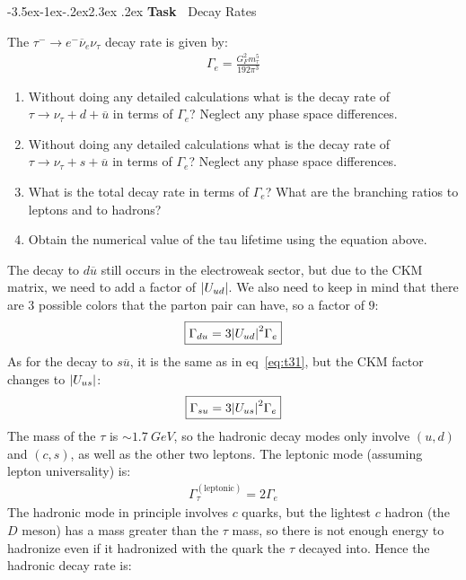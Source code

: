 \documentclass[12pt]{article}
\makeatletter
\renewcommand{\bar}{\overline}
\def\section{\@startsection{section}{1}{\z@ }%
  {-3.5ex\@plus -1ex\@minus -.2ex}{2.3ex \@plus .2ex}%
  {\noindent\normalfont \Large \bfseries Task\ }%
}
\numberwithin{equation}{section}
\makeatother
\begin{document}
\section{Decay Rates}
\begin{problem}
  The $\tau^-\to e^-\overline{\nu}_e\nu_\tau$ decay rate is given by:
  \begin{align*}
    \Gamma_e=\frac{G_F^2m_\tau^5}{192\pi^3}
  \end{align*}
  \begin{enumerate}
  \item Without doing any detailed calculations what is the decay rate of $\tau\to\nu_\tau+d+\overline{u}$ in terms of  $\Gamma_e$? Neglect any phase space differences.
  \item Without doing any detailed calculations what is the decay rate of $\tau\to\nu_\tau+s+\overline{u}$ in terms of  $\Gamma_e$? Neglect any phase space differences.
  \item What is the total decay rate in terms of $\Gamma_e$? What are the branching ratios to leptons and to hadrons?
  \item Obtain the numerical value of the tau lifetime using the equation above.
  \end{enumerate}
\end{problem}
The decay to $d\overline{u}$ still occurs in the electroweak sector, but due to the CKM matrix, we need to add a factor of $\abs{U_{ud}}$. We also need to keep in mind that there are 3 possible colors that the parton pair can have, so a factor of $9$:
\begin{equation}
  \label{eq:t31}
  \boxed{\Gamma_{du}=3\abs{U_{ud}}^2\Gamma_e}
\end{equation}
As for the decay to $s\bar{u}$, it is the same as in eq~\eqref{eq:t31}, but the CKM factor changes to $\abs{U_{us}}$:
\begin{equation}
  \label{eq:t32}
  \boxed{\Gamma_{su}=3\abs{U_{us}}^2\Gamma_e}
\end{equation}
The mass of the $\tau$ is $\sim\SI{1.7}{GeV}$, so the hadronic decay modes only involve $(u,d)$ and $(c,s)$, as well as the other two leptons. The leptonic mode (assuming lepton universality) is:
\begin{align*}
  \Gamma_\tau^{(\text{leptonic})}=2\Gamma_e
\end{align*}
The hadronic mode in principle involves $c$ quarks, but the lightest $c$ hadron (the $D$ meson) has a mass greater than the $\tau$ mass, so there is not enough energy to hadronize even  if it hadronized with the quark the $\tau$ decayed into. Hence the hadronic decay rate is:
\end{document}
